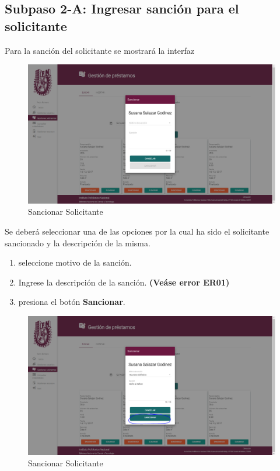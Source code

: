 \subsection{Subpaso 2-A: Ingresar sanción para el solicitante}	
	Para la sanción del solicitante se mostrará la interfaz 
	
	\begin{figure}[hbtp]

	\includegraphics[scale=0.3]{images/Interfaz/IUGS07_sancionarSolicitante.PNG}
	\caption{Sancionar Solicitante}
	\end{figure}
	
	 Se	deberá seleccionar una de las opciones por la cual 
	ha sido el solicitante sancionado y la descripción 
	de la misma.	
	\begin{enumerate}
		\item seleccione motivo de la sanción.
		\item Ingrese la descripción de la sanción. \textbf{(Veáse error ER01)}
		\item presiona el botón \textbf{Sancionar}. 
	\end{enumerate}
		\begin{figure}[hbtp]

	\includegraphics[scale=0.3]{images/Interfaz/IUGS07_sancionarSolicitanteBoton.PNG}
	\caption{Sancionar Solicitante}
	\end{figure}
		
